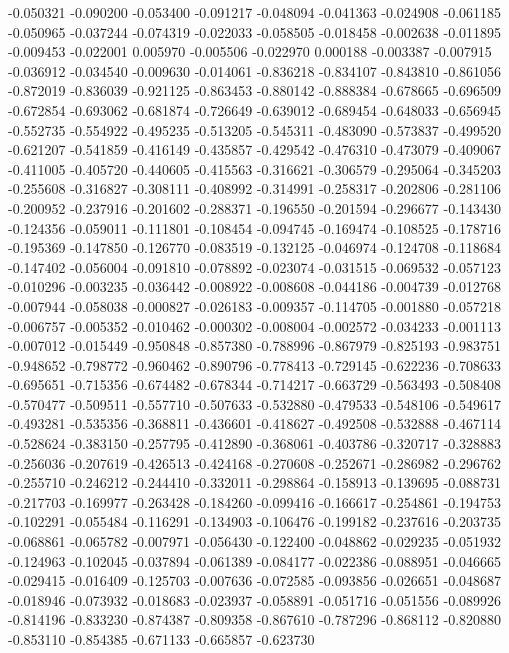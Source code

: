 -0.050321
-0.090200
-0.053400
-0.091217
-0.048094
-0.041363
-0.024908
-0.061185
-0.050965
-0.037244
-0.074319
-0.022033
-0.058505
-0.018458
-0.002638
-0.011895
-0.009453
-0.022001
0.005970
-0.005506
-0.022970
0.000188
-0.003387
-0.007915
-0.036912
-0.034540
-0.009630
-0.014061
-0.836218
-0.834107
-0.843810
-0.861056
-0.872019
-0.836039
-0.921125
-0.863453
-0.880142
-0.888384
-0.678665
-0.696509
-0.672854
-0.693062
-0.681874
-0.726649
-0.639012
-0.689454
-0.648033
-0.656945
-0.552735
-0.554922
-0.495235
-0.513205
-0.545311
-0.483090
-0.573837
-0.499520
-0.621207
-0.541859
-0.416149
-0.435857
-0.429542
-0.476310
-0.473079
-0.409067
-0.411005
-0.405720
-0.440605
-0.415563
-0.316621
-0.306579
-0.295064
-0.345203
-0.255608
-0.316827
-0.308111
-0.408992
-0.314991
-0.258317
-0.202806
-0.281106
-0.200952
-0.237916
-0.201602
-0.288371
-0.196550
-0.201594
-0.296677
-0.143430
-0.124356
-0.059011
-0.111801
-0.108454
-0.094745
-0.169474
-0.108525
-0.178716
-0.195369
-0.147850
-0.126770
-0.083519
-0.132125
-0.046974
-0.124708
-0.118684
-0.147402
-0.056004
-0.091810
-0.078892
-0.023074
-0.031515
-0.069532
-0.057123
-0.010296
-0.003235
-0.036442
-0.008922
-0.008608
-0.044186
-0.004739
-0.012768
-0.007944
-0.058038
-0.000827
-0.026183
-0.009357
-0.114705
-0.001880
-0.057218
-0.006757
-0.005352
-0.010462
-0.000302
-0.008004
-0.002572
-0.034233
-0.001113
-0.007012
-0.015449
-0.950848
-0.857380
-0.788996
-0.867979
-0.825193
-0.983751
-0.948652
-0.798772
-0.960462
-0.890796
-0.778413
-0.729145
-0.622236
-0.708633
-0.695651
-0.715356
-0.674482
-0.678344
-0.714217
-0.663729
-0.563493
-0.508408
-0.570477
-0.509511
-0.557710
-0.507633
-0.532880
-0.479533
-0.548106
-0.549617
-0.493281
-0.535356
-0.368811
-0.436601
-0.418627
-0.492508
-0.532888
-0.467114
-0.528624
-0.383150
-0.257795
-0.412890
-0.368061
-0.403786
-0.320717
-0.328883
-0.256036
-0.207619
-0.426513
-0.424168
-0.270608
-0.252671
-0.286982
-0.296762
-0.255710
-0.246212
-0.244410
-0.332011
-0.298864
-0.158913
-0.139695
-0.088731
-0.217703
-0.169977
-0.263428
-0.184260
-0.099416
-0.166617
-0.254861
-0.194753
-0.102291
-0.055484
-0.116291
-0.134903
-0.106476
-0.199182
-0.237616
-0.203735
-0.068861
-0.065782
-0.007971
-0.056430
-0.122400
-0.048862
-0.029235
-0.051932
-0.124963
-0.102045
-0.037894
-0.061389
-0.084177
-0.022386
-0.088951
-0.046665
-0.029415
-0.016409
-0.125703
-0.007636
-0.072585
-0.093856
-0.026651
-0.048687
-0.018946
-0.073932
-0.018683
-0.023937
-0.058891
-0.051716
-0.051556
-0.089926
-0.814196
-0.833230
-0.874387
-0.809358
-0.867610
-0.787296
-0.868112
-0.820880
-0.853110
-0.854385
-0.671133
-0.665857
-0.623730
